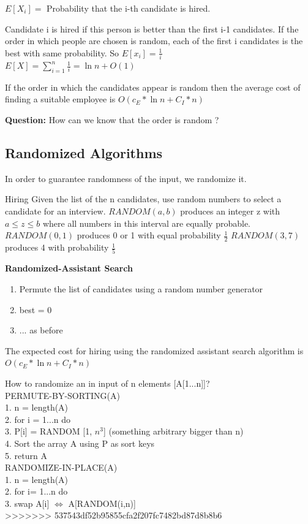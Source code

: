 $E[X{_i}] = $ Probability that the i-th candidate is hired.


Candidate i is hired if this person is better than the first i-1 candidates. If the order in which people are chosen is random, each of the first i candidates is the best with same probability.
So $E[x{_i}] =\frac{1}{i}$\\
$E[X] =  \sum\limits_{i=1}^n \frac{1}{i} = \ln n + O(1)$ 


\begin{lemma}
If the order in which the candidates appear is random then the average cost of finding a suitable employee is
$ O( c_E *  \ln n + C_I * n)$
\end{lemma}

\textbf{Question:}
How can we know that the order is random ?\\

\subsection{Randomized Algorithms}
In order to guarantee randomness of the input, we randomize it. 

\begin{example}{Hiring}
Given the list of the n candidates, use random numbers to select a candidate for an interview.
$RANDOM(a,b)$ produces an integer z with  $a \leq z \leq b$ where all numbers in this interval are equally probable. 
$RANDOM(0,1)$ produces 0 or 1 with equal probability $\frac{1}{2}$
$RANDOM(3,7)$ produces 4 with probability $\frac{1}{5}$ \\
\end{example}
  
\textbf{Randomized-Assistant Search}
\begin{enumerate}[label={\arabic*.}]
 \item Permute the list of candidates using a  random number generator
 \item best = 0
 \item ... as before
\end{enumerate}

\begin{lemma}
The expected cost for hiring using the randomized assistant search algorithm is \\
$O( c_E * \ln n + C_I * n)$
\end{lemma}
How to randomize an in input of n elements [A[1...n]]? \\
PERMUTE-BY-SORTING(A) \\
1.	n = length(A) \\
2.	for i = 1...n do \\
3.	P[i] = RANDOM [1, $n^3$] (something arbitrary bigger than n) \\
4.	Sort the array A using P as sort keys \\
5.	return A \\
\newline
RANDOMIZE-IN-PLACE(A) \\
1.	n = length(A) \\
2.	for i= 1...n do \\
3.	  swap A[i] $\Leftrightarrow$  A[RANDOM(i,n)] \\
>>>>>>> 537543df52b95855cfa2f207fc7482bd87d8b8b6

